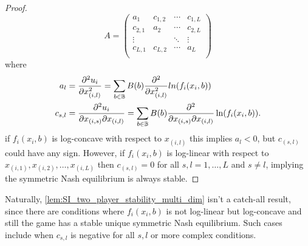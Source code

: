 \documentclass{article}
\newcommand {\B}{\mathbb{B}}
\begin{document}
\begin{proof}
                    \begin{equation}
                        A=\begin{pmatrix}
                        a_{1} & c_{1,2}& \cdots &c_{1,L} \\ %
                        c_{2,1} & a_{2} & \cdots & c_{2,L} \\ %
                        \vdots &  & \ddots &\vdots  \\ %
                        c_{L,1} & c_{L,2} & \cdots & a_{L} \\ %
                        \end{pmatrix}
                    \end{equation}
                    where 
                    \begin{align}
                        a_{l}&= \pdv[2]{u_{i}}{x_{(i,l)}}=\sum_{b\in \B}B(b)\pdv[2]{}{x_{(i,l)}}ln(f_{i}(x_i,b)) \\ %
                        c_{s,l}&=\pdv{u_i}{x_{(i,s)}}{x_{(i,l)}}=\sum_{b\in \B} B(b)\pdv{}{x_{(i,s)}}{x_{(i,l)}}\ln(f_{i}(x_i,b)).
                    \end{align} 
                    if $f_{i}(x_i,b)$ is log-concave with respect to $x_{(i,l)}$ this implies $a_l<0$, but $c_{(s,l)}$ could have any sign. However, if $f_{i}(x_i,b)$ is log-linear with respect to $x_{(i,1)},x_{(i,2)},\dots, x_{(i,L)}$ then $c_{(s,l)}=0$ for all $s,l= 1,\dots,L$ and $s\neq l$, implying the symmetric Nash equilibrium is always stable.
                \end{proof}
            Naturally, \cref{lem:SI_two_player_stability_multi_dim} isn't a catch-all result, since there are conditions where $f_i(x_i,b)$ is not log-linear but log-concave and still the game has a stable unique symmetric Nash equilibrium. Such cases include when $c_{s,l}$ is negative for all $s,l$ or more complex conditions.
\end{document}
